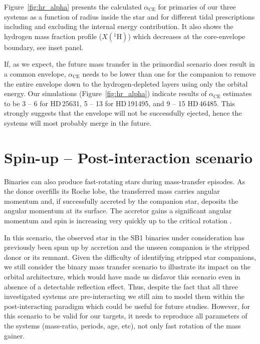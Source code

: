 \documentclass{aa}
\DeclareRobustCommand{\Figref}[1]{Figure~\ref{#1}}
\begin{document}
\Figref{fig:hr_alpha} presents the calculated $\alpha_\mathrm{CE}$ for
primaries of our three systems as a function of radius inside the star
and for different tidal prescriptions including and excluding the
  internal energy contribution. It
also shows the %
hydrogen mass fraction profile
($X(^{1}\mathrm{H})$) which decreases at the core-envelope boundary, see inset panel.

If, as we expect, the future mass transfer in the
  primordial scenario does result in a common envelope,
$\alpha_\mathrm{CE}$ needs to be lower than one for the
  companion to remove the entire envelope down to the
  hydrogen-depleted layers using only the orbital energy. Our simulations (\Figref{fig:hr_alpha}) indicate results of $\alpha_\mathrm{CE}$ estimates to be 3
-- 6 for HD\,25631, 5 -- 13 for HD\,191495, and 9 -- 15 HD\,46485.
This strongly suggests that the envelope will not be successfully ejected, hence the
systems will most probably merge in the future.

\section{Spin-up -- Post-interaction scenario}
\label{sec:post-interaction}


Binaries can also produce fast-rotating stars during mass-transfer episodes. As
the donor overfills its Roche lobe, the transferred mass carries
angular momentum and, if successfully accreted by the companion star,
deposits the angular momentum at its surface.
The accretor gains a significant angular momentum and spin is
increasing very quickly up to the critical rotation \citep{packet:81, Langer_2003, Renzo_2021}.

 In this scenario, the observed star in the SB1 binaries under consideration has previously been spun up by accretion and the
  unseen companion is the stripped donor \citep[e.g.,][]{Gotberg_2023, Drout_2023} or its remnant.
Given the difficulty of identifying stripped star companions, we still consider the binary mass transfer scenario to illustrate its impact on the orbital architecture, which would have made us disfavor this scenario even in absence of a detectable reflection effect.
Thus, despite the fact that all three investigated systems are pre-interacting we still aim to model them within the post-interacting paradigm which could be useful for future studies.
However, for this scenario to be valid for our targets, it needs to reproduce
all parameters of the systems (mass-ratio, periods, age, etc), not only fast rotation of the mass gainer.
\end{document}
